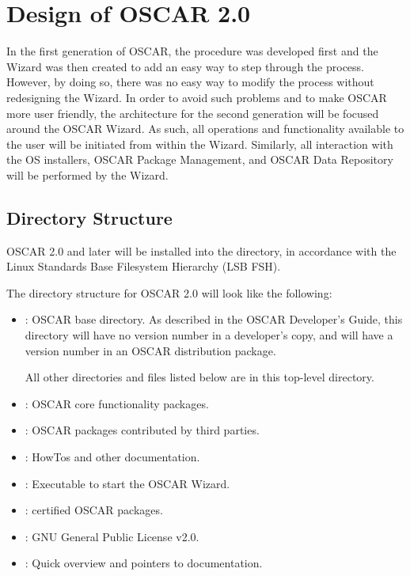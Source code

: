 %
%
%

\section{Design of OSCAR 2.0}

In the first generation of OSCAR, the procedure was developed first
and the Wizard was then created to add an easy way to step through the
process. However, by doing so, there was no easy way to modify the
process without redesigning the Wizard. In order to avoid such
problems and to make OSCAR more user friendly, the architecture for
the second generation will be focused around the OSCAR Wizard. As
such, all operations and functionality available to the user will be
initiated from within the Wizard. Similarly, all interaction with the
OS installers, OSCAR Package Management, and OSCAR Data Repository
will be performed by the Wizard.

\subsection{Directory Structure}

OSCAR 2.0 and later will be installed into the  directory,
in accordance with the Linux Standards Base Filesystem Hierarchy (LSB
FSH).

The directory structure for OSCAR 2.0 will look like the following:

\begin{itemize}
\item {}: OSCAR base directory.  As described
  in the OSCAR Developer's Guide, this directory will have no version
  number in a developer's copy, and will have a version number in an
  OSCAR distribution package.
  
  All other directories and files listed below are in this top-level
  directory.

\item {}: OSCAR core functionality packages.
  
\item {}: OSCAR packages contributed by third
  parties.

\item {}: HowTos and other documentation.

\item {}: Executable to start the OSCAR Wizard.

\item {}: certified OSCAR packages.

\item {}: GNU General Public License v2.0.
  
\item {}: Quick overview and pointers to documentation.
\end{itemize}

